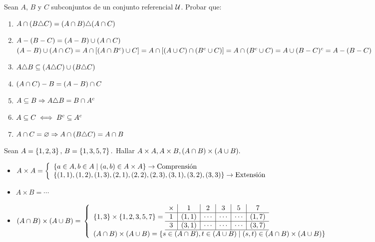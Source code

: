 \documentclass[12pt,a4paper, spanish]{article}
\begin{document}
\ejercicio Sean $A$, $B$ y $C$ subconjuntos de un conjunto referencial $\universo$. Probar que:
\begin{enumerate}[label=\roman*)]
	\item $A \inter (B \triangle C) = (A \inter B) \triangle (A \inter C)$

	\item $A - (B - C) = (A-B) \union (A \inter C)$\\
	      $(A - B) \union (A \inter C) = A \inter [(A \inter B^c) \union C] = A \inter [(A \union C) \inter (B^c \union C)] =\\
		      A \inter (B^c \union C) = A \union(B-C)^c = A - (B - C)$

	\item $A \triangle B \subseteq (A \triangle C) \union (B \triangle C)$ \Hacer
	\item $(A \inter C ) - B = (A - B) \inter C$
	\item $A \subseteq B \entonces A \triangle B = B \inter A^c$
	\item $A \subseteq C \sisolosi B^c \subseteq A^c$
	\item $A \inter C = \vacio \entonces A \inter (B \triangle C) = A \inter B$
\end{enumerate}


\ejercicio Sean $A = \set{1, 2, 3},\, B = \set{1, 3, 5, 7}.$ Hallar $A \times A, A \times B, (A \inter B) \times (A \union B).$

\begin{itemize}
	\item $A \times A =
		      \llave{l}{
			      \set{a \en A, b \en A \talque (a, b) \en A \times A} \to \text{Comprensión}\\
			      \set{(1,1), (1,2), (1,3),(2,1),(2,2), (2,3), (3,1), (3,2), (3,3)} \to \text{Extensión}
		      }$

	\item  $A \times B = \cdots$

	\item $(A \inter B) \times (A \union B) = \\
		      \llave{l}{
			      \set{1, 3} \times \set{1,2,3,5,7} =
			      \begin{array}{c|c|c|c|c|c}
				      \times & 1     & 2      & 3      & 5      & 7     \\
				      \hline
				      1      & (1,1) & \cdots & \cdots & \cdots & (1,7) \\
				      \hline
				      3      & (3,1) & \cdots & \cdots & \cdots & (3,7) \\
				      \hline
			      \end{array}\\

			      (A \inter B) \times (A \union B) = \set{s \en (A \inter B), t \en (A \union B) \talque (s, t) \en (A \inter B) \times (A \union B)}
		      }$
\end{itemize}
\end{document}
